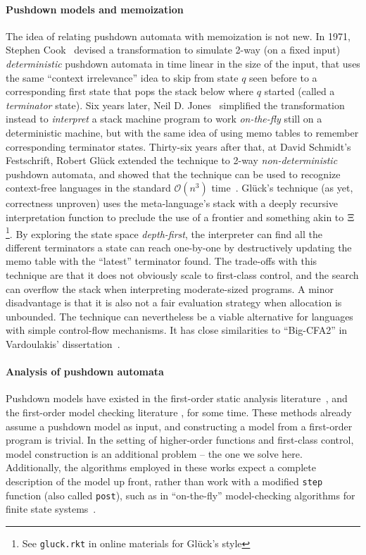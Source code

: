\paragraph{Pushdown models and memoization}
The idea of relating pushdown automata with memoization is not new.
%
In 1971, Stephen Cook~\citep{DBLP:conf/ifip/Cook71} devised a transformation to simulate 2-way (on a fixed input) \emph{deterministic} pushdown automata in time linear in the size of the input, that uses the same ``context irrelevance'' idea to skip from state $q$ seen before to a corresponding first state that pops the stack below where $q$ started (called a \emph{terminator} state).
%
Six years later, Neil D. Jones~\citep{Jones:1977:NLT} simplified the transformation instead to \emph{interpret} a stack machine program to work \emph{on-the-fly} still on a deterministic machine, but with the same idea of using memo tables to remember corresponding terminator states.
%
Thirty-six years after that, at David Schmidt's Festschrift, Robert Gl\"uck extended the technique to 2-way \emph{non-deterministic} pushdown automata, and showed that the technique can be used to recognize context-free languages in the standard ${\mathcal O}(n^3)$ time~\citep{DBLP:journals/corr/Gluck13}.
%
Gl\"uck's technique (as yet, correctness unproven) uses the meta-language's stack with a deeply recursive interpretation function to preclude the use of a frontier and something akin to $\Xi$\footnote{See \texttt{gluck.rkt} in online materials for Gl\"uck's style}.
%
By exploring the state space \emph{depth-first}, the interpreter can find all the different terminators a state can reach one-by-one by destructively updating the memo table with the ``latest'' terminator found.
%
The trade-offs with this technique are that it does not obviously scale to first-class control, and the search can overflow the stack when interpreting moderate-sized programs.
%
A minor disadvantage is that it is also not a fair evaluation strategy when allocation is unbounded.
%
The technique can nevertheless be a viable alternative for languages with simple control-flow mechanisms.
%
It has close similarities to ``Big-CFA2'' in Vardoulakis' dissertation~\citep{vardoulakis-diss12}.

\paragraph{Analysis of pushdown automata}
Pushdown models have existed in the first-order static analysis literature~\citep[Chapter 7]{local:muchnick:jones:flow-analysis:1981}\citep{dvanhorn:Reps1995Precise}, and the first-order model checking literature \citep{dvanhorn:Bouajjani1997Reachability}, for some time.
%
These methods already assume a pushdown model as input, and constructing a model from a first-order program is trivial.
%
In the setting of higher-order functions and first-class control, model construction is an additional problem -- the one we solve here.
%
Additionally, the algorithms employed in these works expect a complete description of the model up front, rather than work with a modified \texttt{step} function (also called \texttt{post}), such as in ``on-the-fly'' model-checking algorithms for finite state systems~\citep{dvanhorn:Schwoon2005Note}.


